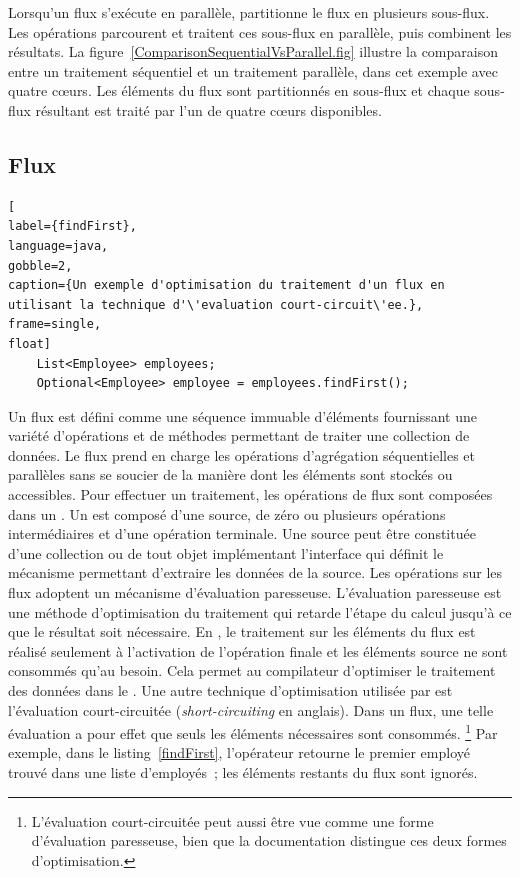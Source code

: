 Lorsqu'un flux s'ex\'ecute en parall\`ele,  partitionne le flux en plusieurs sous-flux. Les op\'erations parcourent et traitent ces sous-flux en parall\`ele, puis combinent les r\'esultats. La figure~\ref{ComparisonSequentialVsParallel.fig} illustre la comparaison entre  un traitement s\'equentiel et un traitement parall\`ele, dans cet exemple avec quatre c\oe{}urs. Les \'el\'ements du flux sont partitionn\'es en sous-flux et chaque sous-flux r\'esultant est trait\'e par l'un de quatre cœurs disponibles.  



\subsection{Flux}


\begin{lstlisting}[
label={findFirst},
language=java,
gobble=2,
caption={Un exemple d'optimisation du traitement d'un flux en utilisant la technique d'\'evaluation court-circuit\'ee.},
frame=single,
float]
	List<Employee> employees;
	Optional<Employee> employee = employees.findFirst();
\end{lstlisting}


Un flux est d\'efini comme une s\'equence immuable d'\'el\'ements fournissant une vari\'et\'e d'op\'erations et de m\'ethodes permettant de traiter une collection de donn\'ees. Le flux prend en charge les op\'erations d'agr\'egation \citep{javaStreamAggregate} s\'equentielles et parall\`eles sans se soucier de la mani\`ere dont les \'el\'ements sont stock\'es ou accessibles. Pour effectuer un traitement, les op\'erations de flux sont compos\'ees dans un . Un  est compos\'e d'une source, de z\'ero ou plusieurs op\'erations interm\'ediaires et d'une op\'eration terminale. Une source peut \^etre constitu\'ee d'une collection ou de tout objet impl\'ementant l'interface qui d\'efinit le m\'ecanisme permettant d'extraire les donn\'ees de la source. 
Les op\'erations sur les flux adoptent un m\'ecanisme d'\'evaluation paresseuse. L'\'evaluation paresseuse est une m\'ethode d'optimisation du traitement qui retarde l'\'etape du calcul jusqu'\`a ce que le r\'esultat soit nécessaire. En , le traitement sur les \'el\'ements du flux est r\'ealis\'e seulement \`a l'activation de l'op\'eration finale et les \'el\'ements source ne sont consomm\'es qu'au besoin. Cela permet au compilateur d'optimiser le traitement des donn\'ees dans le .
Une autre technique d'optimisation utilis\'ee par  est l'\'evaluation court-circuit\'ee (\emph{short-circuiting} en anglais). Dans un flux, une telle \'evaluation a pour effet que seuls les \'el\'ements n\'ecessaires sont consomm\'es.%
%
\footnote{L'\'evaluation court-circuit\'ee peut aussi \^etre vue comme une forme d'\'evaluation paresseuse, bien que la documentation  distingue ces deux formes d'optimisation.}
%
Par exemple, dans le listing~\ref{findFirst}, l'opérateur  retourne le premier employ\'e trouv\'e dans une liste d'employ\'es~; les \'el\'ements restants du flux sont ignor\'es.


